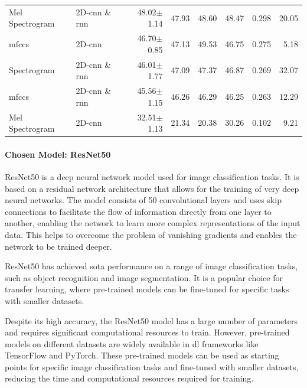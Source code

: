 \begin{table}[H]
{\begin{tabular}{llrrrrrr}
			Mel Spectrogram & 2D-\ac{cnn} \& \ac{rnn} & 48.02$\pm$1.14 & 47.93 & 48.60 & 48.47 & 0.298 & 20.05 \\
			
			\ac{mfccs} &  2D-\ac{cnn} & 46.70$\pm$0.85 & 47.13 & 49.53 & 46.75 & 0.275 & 5.18 \\
			
			Spectrogram & 2D-\ac{cnn} \& \ac{rnn} & 46.01$\pm$1.77 & 47.09 & 47.37 & 46.87 & 0.269 & 32.07 \\
			
			\ac{mfccs} & 2D-\ac{cnn} \& \ac{rnn} & 45.56$\pm$1.15 & 46.26 & 46.29 & 46.25 & 0.263 & 12.29 \\
			
			Mel Spectrogram &  2D-\ac{cnn} & 32.51$\pm$1.13 & 21.34 & 20.38 & 30.26 & 0.102 & 9.21 \\
			
			\bottomrule
		\end{tabular}%
	}
\end{table}

\paragraph{Chosen Model: ResNet50}

ResNet50 is a deep neural network model used for image classification tasks. It is based on a residual network architecture that allows for the training of very deep neural networks. The model consists of 50 convolutional layers and uses skip connections to facilitate the flow of information directly from one layer to another, enabling the network to learn more complex representations of the input data. This helps to overcome the problem of vanishing gradients and enables the network to be trained deeper.

ResNet50 has achieved \ac{sota} performance on a range of image classification tasks, such as object recognition and image segmentation. It is a popular choice for transfer learning, where pre-trained models can be fine-tuned for specific tasks with smaller datasets.

Despite its high accuracy, the ResNet50 model has a large number of parameters and requires significant computational resources to train. However, pre-trained models on different datasets are widely available in \ac{dl} frameworks like TensorFlow and PyTorch. These pre-trained models can be used as starting points for specific image classification tasks and fine-tuned with smaller datasets, reducing the time and computational resources required for training.

